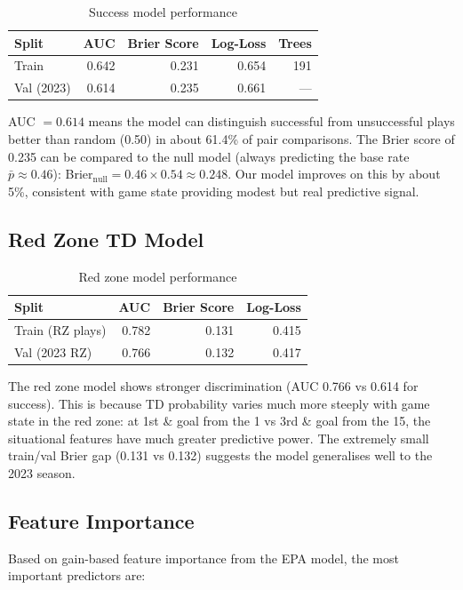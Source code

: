 \documentclass[11pt]{article}
\begin{document}
\begin{table}[H]
\centering
\caption{Success model performance}
\begin{tabular}{lrrrr}
\toprule
Split & AUC & Brier Score & Log-Loss & Trees \\
\midrule
Train & 0.642 & 0.231 & 0.654 & 191 \\
Val (2023) & 0.614 & 0.235 & 0.661 & --- \\
\bottomrule
\end{tabular}
\end{table}

AUC $= 0.614$ means the model can distinguish successful from unsuccessful
plays better than random (0.50) in about 61.4\% of pair comparisons. The
Brier score of 0.235 can be compared to the null model (always predicting
the base rate $\bar{p} \approx 0.46$): Brier$_{\text{null}} = 0.46 \times 0.54 \approx 0.248$.
Our model improves on this by about 5\%, consistent with game state providing
modest but real predictive signal.

\subsection{Red Zone TD Model}

\begin{table}[H]
\centering
\caption{Red zone model performance}
\begin{tabular}{lrrr}
\toprule
Split & AUC & Brier Score & Log-Loss \\
\midrule
Train (RZ plays) & 0.782 & 0.131 & 0.415 \\
Val (2023 RZ) & 0.766 & 0.132 & 0.417 \\
\bottomrule
\end{tabular}
\end{table}

The red zone model shows stronger discrimination (AUC 0.766 vs 0.614 for
success). This is because TD probability varies much more steeply with
game state in the red zone: at 1st \& goal from the 1 vs 3rd \& goal
from the 15, the situational features have much greater predictive power.
The extremely small train/val Brier gap (0.131 vs 0.132) suggests the model
generalises well to the 2023 season.

\subsection{Feature Importance}

Based on gain-based feature importance from the EPA model, the most
important predictors are:
\end{document}
